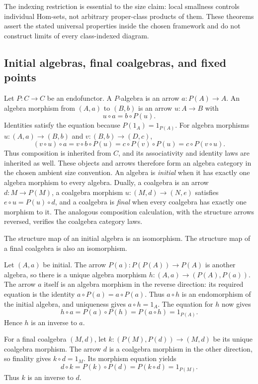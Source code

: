 The indexing restriction is essential to the size claim: local
smallness controls individual Hom-sets, not arbitrary proper-class
products of them. These theorems assert the stated universal properties
inside the chosen framework and do not construct limits of every
class-indexed diagram.

\subsection{Initial algebras, final coalgebras, and fixed points}
Let $P:C\to C$ be an endofunctor. A $P$-algebra is an arrow
$a:P(A)\to A$. An algebra morphism from $(A,a)$ to $(B,b)$ is an
arrow $u:A\to B$ with
\[
u\circ a=b\circ P(u).
\]
Identities satisfy the equation because $P(1_A)=1_{P(A)}$.
For algebra morphisms $u:(A,a)\to(B,b)$ and $v:(B,b)\to(D,c)$,
\[
(v\circ u)\circ a
=v\circ b\circ P(u)
=c\circ P(v)\circ P(u)
=c\circ P(v\circ u).
\]
Thus composition is inherited from $C$, and its associativity and identity
laws are inherited as well. These objects and arrows therefore form an
algebra category in the chosen ambient size convention.
An algebra is \emph{initial} when it has exactly one
algebra morphism to every algebra. Dually, a coalgebra is an arrow
$d:M\to P(M)$, a coalgebra morphism $u:(M,d)\to(N,e)$ satisfies
$e\circ u=P(u)\circ d$, and a coalgebra is \emph{final} when every
coalgebra has exactly one morphism to it. The analogous composition
calculation, with the structure arrows reversed, verifies the coalgebra
category laws.

\begin{lemma}
\label{lem:lambek}
The structure map of an initial algebra is an isomorphism. The
structure map of a final coalgebra is also an isomorphism.
\end{lemma}
\Proof
Let $(A,a)$ be initial. The arrow $P(a):P(P(A))\to P(A)$ is another
algebra, so there is a unique algebra morphism
$h:(A,a)\to(P(A),P(a))$. The arrow $a$ itself is an algebra morphism
in the reverse direction: its required equation is the identity
$a\circ P(a)=a\circ P(a)$. Thus $a\circ h$ is an endomorphism of
the initial algebra, and uniqueness gives $a\circ h=1_A$.
The equation for $h$ now gives
\[
h\circ a=P(a)\circ P(h)=P(a\circ h)=1_{P(A)}.
\]
Hence $h$ is an inverse to $a$.

For a final coalgebra $(M,d)$, let
$k:(P(M),P(d))\to(M,d)$ be its unique coalgebra morphism.
The arrow $d$ is a coalgebra morphism in the other direction, so finality
gives $k\circ d=1_M$. Its morphism equation yields
\[
d\circ k=P(k)\circ P(d)=P(k\circ d)=1_{P(M)}.
\]
Thus $k$ is an inverse to $d$.
\Done

